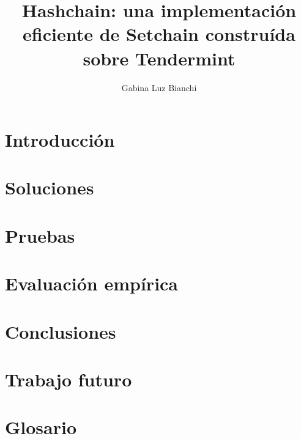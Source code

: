 \documentclass[12pt, oneside]{book}
\title{Hashchain: una implementación eficiente de Setchain construída sobre Tendermint}
\author{Gabina Luz Bianchi}
\begin{document}
\maketitle



\tableofcontents{}

\chapter{Introducción}





\chapter{Soluciones}


\chapter{Pruebas}


\chapter{Evaluación empírica}


\chapter{Conclusiones}


\chapter{Trabajo futuro}


\chapter{Glosario}






% 


% 


% 



% 
\end{document}

